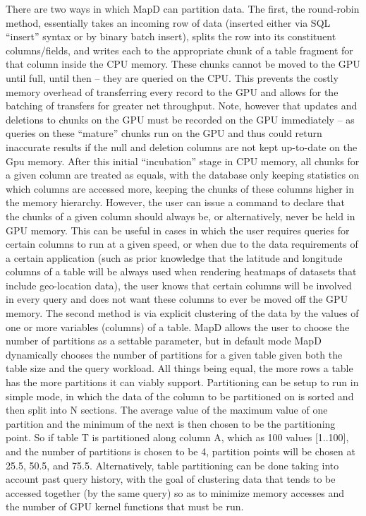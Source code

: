 \documentclass[twocolumn]{article}
\begin{document}


There are two ways in which MapD can partition data. The first, the round-robin method, essentially takes an incoming row of data (inserted either via SQL “insert” syntax or by binary batch insert), splits the row into its constituent columns/fields, and writes each to the appropriate chunk of a table fragment for that column inside the CPU memory. These chunks cannot be moved to the GPU until full, until then – they are queried on the CPU. This prevents the costly memory overhead of transferring every record to the GPU and allows for the batching of transfers for greater net throughput. Note, however that updates and deletions to chunks on the GPU must be recorded on the GPU immediately – as queries on these “mature” chunks run on the GPU and thus could return inaccurate results if the null and deletion columns are not kept up-to-date on the Gpu memory. After this initial “incubation” stage in CPU memory, all chunks for a given column are treated as equals, with the database only keeping statistics on which columns are accessed more, keeping the chunks of these columns higher in the memory hierarchy. However, the user can issue a command to declare that the chunks of a given column should always be, or alternatively, never be held in GPU memory. This can be useful in cases in which the user requires queries for certain columns to run at a given speed, or when due to the data requirements of a certain application (such as prior knowledge that the latitude and longitude columns of a table will be always used when rendering heatmaps of datasets that include geo-location data), the user knows that certain columns will be involved in every query and does not want these columns to ever be moved off the GPU memory.
The second method is via explicit clustering of the data by the values of one or more variables (columns) of a table. MapD allows the user to choose the number of partitions as a settable parameter, but in default mode MapD dynamically chooses the number of partitions for a given table given both the table size and the query workload. All things being equal, the more rows a table has the more partitions it can viably support. Partitioning can be setup to run in simple mode, in which the data of the column to be partitioned on is sorted and then split into N sections. The average value of the maximum value of one partition and the minimum of the next is then chosen to be the partitioning point. So if table T is partitioned along column A, which as 100 values [1..100], and the number of partitions is chosen to be 4, partition points will be chosen at 25.5, 50.5, and 75.5. Alternatively, table partitioning can be done taking into account past query history, with the goal of clustering data that tends to be accessed together (by the same query) so as to minimize memory accesses and the number of GPU kernel functions that must be run.
\end{document}
